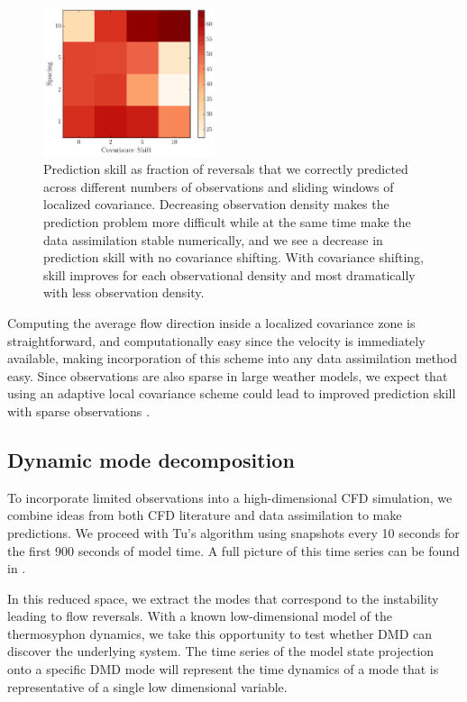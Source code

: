 \documentclass[pre,twocolumn,twoside,byrevtex,superscriptaddress]{revtex4}
\begin{document}
\begin{figure}[h]
  \centering
  \includegraphics[width=0.45\textwidth]{fig09_2015-09-30-19-59-consuela-2.pdf}
  \caption[]{
    Prediction skill as fraction of reversals that we correctly predicted across different numbers of observations and sliding windows of localized covariance.
    Decreasing observation density makes the prediction problem more difficult while at the same time make the data assimilation stable numerically, and we see a decrease in prediction skill with no covariance shifting.
    With covariance shifting, skill improves for each observational density and most dramatically with less observation density.
  }
  \label{fig:sliding_results}
\end{figure}

Computing the average flow direction inside a localized covariance zone is straightforward, and computationally easy since the velocity is immediately available, making incorporation of this scheme into any data assimilation method easy.
Since observations are also sparse in large weather models, we expect that using an adaptive local covariance scheme could lead to improved prediction skill with sparse observations \cite{bishop2011a}.

\subsection*{Dynamic mode decomposition}
\label{dmd_section}

To incorporate limited observations into a high-dimensional CFD simulation, we combine ideas from both CFD literature and data assimilation to make predictions.
We proceed with Tu's algorithm using snapshots every 10 seconds for the first 900 seconds of model time.
A full picture of this time series can be found in .

In this reduced space, we extract the modes that correspond to the instability leading to flow reversals.
With a known low-dimensional model of the thermosyphon dynamics, we take this opportunity to test whether DMD can discover the underlying system.
The time series of the model state projection onto a specific DMD mode will represent the time dynamics of a mode that is representative of a single low dimensional variable.
\end{document}
